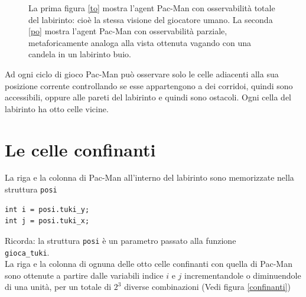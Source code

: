 \documentclass[8pt]{book}
\begin{document}
\begin{figure}[H]
  \caption{La prima figura \ref{to} mostra l'agent Pac-Man con osservabilità totale del labirinto: cioè la stessa visione del giocatore umano. La seconda \ref{po} mostra l'agent Pac-Man con osservabilità parziale, metaforicamente analoga alla vista ottenuta vagando con una candela in un labirinto buio.
} 
\end{figure}

Ad ogni ciclo di gioco Pac-Man può osservare solo le celle adiacenti alla sua posizione corrente controllando se esse appartengono a dei corridoi, quindi sono accessibili, oppure alle pareti del labirinto e quindi sono ostacoli. Ogni cella del labirinto ha otto celle vicine.

\section{Le celle confinanti}

La riga e la colonna di Pac-Man all'interno del labirinto sono memorizzate nella struttura \texttt{posi}

  \begin{spacing}{0.9}
    \begin{small}
      \begin{tcolorbox}
\begin{verbatim}
int i = posi.tuki_y;
int j = posi.tuki_x;
\end{verbatim}
\end{tcolorbox}
    \end{small}
  \end{spacing}


\textsf{Ricorda: la struttura} \texttt{posi} \textsf{è un parametro passato alla funzione} \\\texttt{gioca\_tuki}.\\

La riga e la colonna di ognuna delle otto celle confinanti con quella di Pac-Man sono ottenute a partire dalle variabili indice $i$ e $j$ incrementandole o diminuendole di una unità, per un totale di $2^3$ diverse combinazioni (Vedi figura \ref{confinanti})
\end{document}
